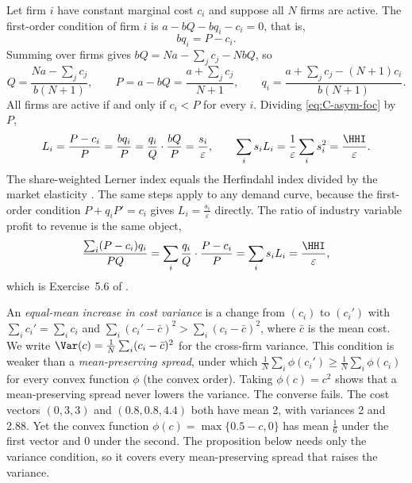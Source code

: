 Let firm $i$ have constant marginal cost $c_i$ and suppose all $N$ firms are active. The first-order
condition of firm $i$ is $a - bQ - bq_i - c_i = 0$, that is,
\begin{equation}\label{eq:C-asym-foc}
bq_i = P - c_i .
\end{equation}
Summing over firms gives $bQ = Na - \sum_j c_j - NbQ$, so
\begin{equation}\label{eq:C-asym}
Q = \frac{Na - \sum_j c_j}{b(N + 1)}, \qquad P = a - bQ = \frac{a + \sum_j c_j}{N + 1}, \qquad
q_i = \frac{a + \sum_j c_j - (N + 1)c_i}{b(N + 1)} .
\end{equation}
All firms are active if and only if $c_i < P$ for every $i$. Dividing \eqref{eq:C-asym-foc} by $P$,
\begin{equation*}
L_i = \frac{P - c_i}{P} = \frac{bq_i}{P} = \frac{q_i}{Q}\cdot\frac{bQ}{P} = \frac{s_i}{\varepsilon},
\qquad
\sum_i s_iL_i = \frac{1}{\varepsilon}\sum_i s_i^2 = \frac{\HHI}{\varepsilon} .
\end{equation*}
The share-weighted Lerner index equals the Herfindahl index divided by the market elasticity
\citep{CowlingWaterson1976}. The same steps apply to any demand curve, because the first-order condition
$P + q_iP' = c_i$ gives $L_i = \frac{s_i}{\varepsilon}$ directly. The ratio of industry variable profit to revenue is
the same object,
\begin{equation*}
\frac{\sum_i(P - c_i)q_i}{PQ} = \sum_i\frac{q_i}{Q}\cdot\frac{P - c_i}{P} = \sum_is_iL_i = \frac{\HHI}{\varepsilon} ,
\end{equation*}
which is Exercise~5.6 of \citet[Section~5.5]{Tirole1988}.

An \emph{equal-mean increase in cost variance} is a change from $(c_i)$ to $(c_i')$ with
$\sum_i c_i' = \sum_i c_i$ and $\sum_i(c_i' - \bar c)^2 > \sum_i(c_i - \bar c)^2$, where $\bar c$ is the mean cost.
We write $\Var(c) = \frac{1}{N}\sum_i(c_i - \bar c)^2$ for the cross-firm variance. This condition is weaker than a
\emph{mean-preserving spread}, under which $\frac{1}{N}\sum_i\phi(c_i') \ge \frac{1}{N}\sum_i\phi(c_i)$ for every convex
function $\phi$ (the convex order). Taking $\phi(c) = c^2$ shows that a mean-preserving spread never lowers the variance.
The converse fails. The cost vectors $(0, 3, 3)$ and $(0.8, 0.8, 4.4)$ both have mean 2, with variances 2 and 2.88. Yet
the convex function $\phi(c) = \max\{0.5 - c, 0\}$ has mean $\frac{1}{6}$ under the first vector and 0 under the second.
The proposition below needs only the variance condition, so it covers every mean-preserving spread that raises the
variance.

